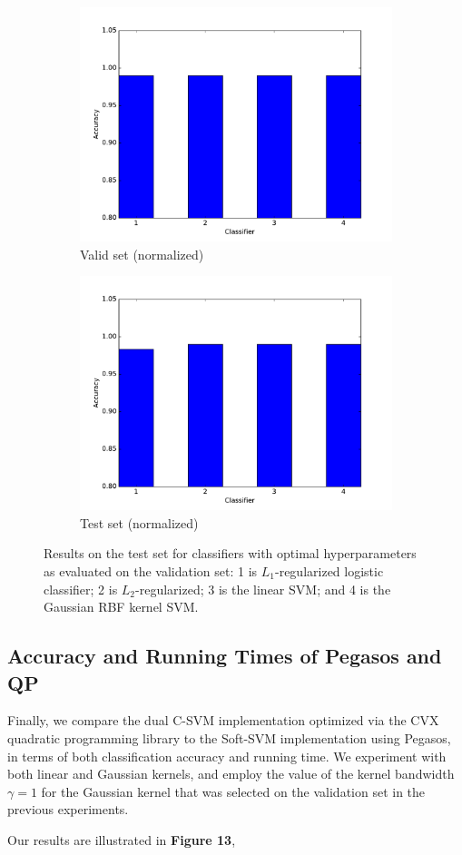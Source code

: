 \documentclass[10pt,psamsfonts]{amsart}
\theoremstyle{definition}
\theoremstyle{remark}
\numberwithin{equation}{section}
\begin{document}
\begin{figure}
\begin{subfigure}[b]{0.23\textwidth}
		\includegraphics[width=\textwidth]{hw2_4-2_valid_norm.pdf}
		\caption{Valid set (normalized)}
	\end{subfigure}
	\begin{subfigure}[b]{0.23\textwidth}
		\includegraphics[width=\textwidth]{hw2_4-2_test_norm.pdf}
		\caption{Test set (normalized)}
	\end{subfigure}
	\caption{Results on the test set for classifiers with optimal hyperparameters as evaluated on the validation set: 1 is $L_1$-regularized logistic classifier; 2 is $L_2$-regularized; 3 is the linear SVM; and 4 is the Gaussian RBF kernel SVM.}
\end{figure}

\subsection{Accuracy and Running Times of Pegasos and QP} Finally, we compare the dual C-SVM implementation optimized via the CVX quadratic programming library to the Soft-SVM implementation using Pegasos, in terms of both classification accuracy and running time. We experiment with both linear and Gaussian kernels, and employ the value of the kernel bandwidth $\gamma = 1$ for the Gaussian kernel that was selected on the validation set in the previous experiments.

Our results are illustrated in {\bf Figure 13}, 
\end{document}
